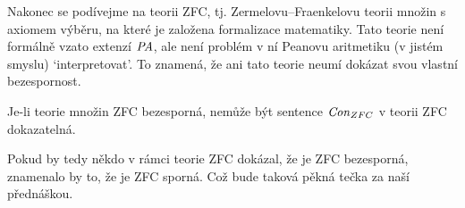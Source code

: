 Nakonec se podívejme na teorii ZFC, tj. Zermelovu–Fraenkelovu teorii množin s axiomem výběru, na které je založena formalizace matematiky. Tato teorie není formálně vzato extenzí $\text{\it PA}$, ale není problém v ní Peanovu aritmetiku (v jistém smyslu) `interpretovat'. To znamená, že ani tato teorie neumí dokázat svou vlastní bezespornost.

\begin{corollary}
    Je-li teorie množin ZFC bezesporná, nemůže být sentence $\mathit{Con}_{ZFC}$ v teorii ZFC dokazatelná.
\end{corollary}

Pokud by tedy někdo v rámci teorie ZFC dokázal, že je ZFC bezesporná, znamenalo by to, že je ZFC sporná. Což bude taková pěkná tečka za naší přednáškou.
